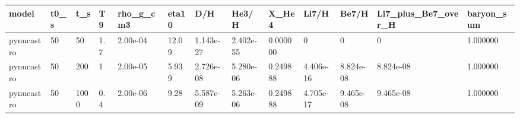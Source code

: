 \begin{tabular}{lllllllllllll}
\toprule
model & t0_s & t_s & T9 & rho_g_cm3 & eta10 & D/H & He3/H & X_He4 & Li7/H & Be7/H & Li7_plus_Be7_over_H & baryon_sum \\
\midrule
pynucastro & 50 & 50 & 1.7 & 2.00e-04 & 12.09 & 1.143e-27 & 2.402e-55 & 0.000000 & 0 & 0 & 0 & 1.000000 \\
pynucastro & 50 & 200 & 1 & 2.00e-05 & 5.939 & 2.726e-08 & 5.280e-06 & 0.249888 & 4.406e-16 & 8.824e-08 & 8.824e-08 & 1.000000 \\
pynucastro & 50 & 1000 & 0.4 & 2.00e-06 & 9.28 & 5.587e-09 & 5.263e-06 & 0.249888 & 4.705e-17 & 9.465e-08 & 9.465e-08 & 1.000000 \\
\bottomrule
\end{tabular}
